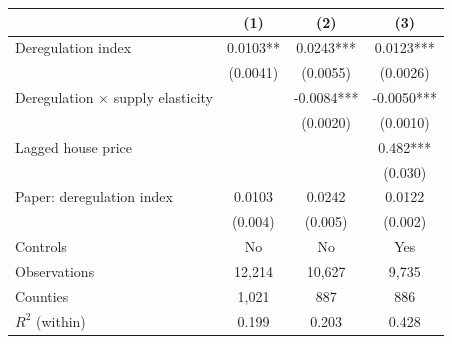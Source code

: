 \begin{tabular}{lccc}
\toprule
 & (1) & (2) & (3) \\
\midrule
Deregulation index & 0.0103** & 0.0243*** & 0.0123*** \\
 & (0.0041) & (0.0055) & (0.0026) \\
Deregulation $\times$ supply elasticity &  & -0.0084*** & -0.0050*** \\
 &  & (0.0020) & (0.0010) \\
Lagged house price &  &  & 0.482*** \\
 &  &  & (0.030) \\
\midrule
Paper: deregulation index & 0.0103 & 0.0242 & 0.0122 \\
 & (0.004) & (0.005) & (0.002) \\
\midrule
Controls & No & No & Yes \\
Observations & 12,214 & 10,627 & 9,735 \\
Counties & 1,021 & 887 & 886 \\
$R^2$ (within) & 0.199 & 0.203 & 0.428 \\
\bottomrule
\end{tabular}